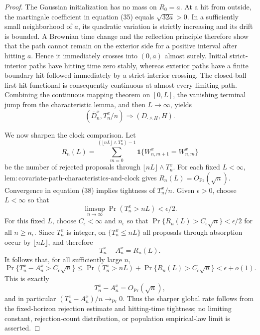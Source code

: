 \documentclass{article}
\begin{document}
\begin{proof}
The Gaussian initialization has no mass on \(R_0=a\). At a hit from outside, the martingale coefficient in equation (35) equals \(\sqrt{32a}>0\). In a sufficiently small neighborhood of \(a\), its quadratic variation is strictly increasing and its drift is bounded. A Brownian time change and the reflection principle therefore show that the path cannot remain on the exterior side for a positive interval after hitting \(a\). Hence it immediately crosses into \((0,a)\) almost surely. Initial strict-interior paths have hitting time zero stably, whereas exterior paths have a finite boundary hit followed immediately by a strict-interior crossing. The closed-ball first-hit functional is consequently continuous at almost every limiting path. Combining the continuous mapping theorem on \([0,L]\), the vanishing terminal jump from the characteristic lemma, and then \(L\to\infty\), yields
\[
 (\bar D_n^x,T_n^x/n)\Rightarrow(D_{\cdot\wedge H},H). \tag{38}
\]

We now sharpen the clock comparison. Let
\[
 R_n(L)=\sum_{m=0}^{(\lfloor nL\rfloor\wedge T_n^x)-1}
 \mathbf 1\{W^x_{n,m+1}=W^x_{n,m}\}
\]
be the number of rejected proposals through \(\lfloor nL\rfloor\wedge T_n^x\). For each fixed \(L<\infty\),
\(\mathrm{lem{:}covariate\mbox{-}path\mbox{-}characteristics\mbox{-}and\mbox{-}clock}\) gives
\(R_n(L)=O_{\Pr}(\sqrt n)\). Convergence in equation (38) implies tightness of \(T_n^x/n\). Given \(\epsilon>0\), choose \(L<\infty\) so that
\[
 \limsup_{n\to\infty}\Pr(T_n^x>nL)<\epsilon/2. \tag{39}
\]
For this fixed \(L\), choose \(C_\epsilon<\infty\) and \(n_\epsilon\) so that
\(\Pr\{R_n(L)>C_\epsilon\sqrt n\}<\epsilon/2\) for all \(n\ge n_\epsilon\). Since \(T_n^x\) is integer, on \(\{T_n^x\le nL\}\) all proposals through absorption occur by \(\lfloor nL\rfloor\), and therefore
\[
 T_n^x-A_n^x=R_n(L).
\]
It follows that, for all sufficiently large \(n\),
\[
 \Pr\{T_n^x-A_n^x>C_\epsilon\sqrt n\}
 \le \Pr(T_n^x>nL)+\Pr\{R_n(L)>C_\epsilon\sqrt n\}<\epsilon+o(1). \tag{40}
\]
This is exactly
\[
 T_n^x-A_n^x=O_{\Pr}(\sqrt n), \tag{41}
\]
and in particular \((T_n^x-A_n^x)/n\to_{\Pr}0\). Thus the sharper global rate follows from the fixed-horizon rejection estimate and hitting-time tightness; no limiting constant, rejection-count distribution, or population empirical-law limit is asserted.


\end{proof}
\end{document}
